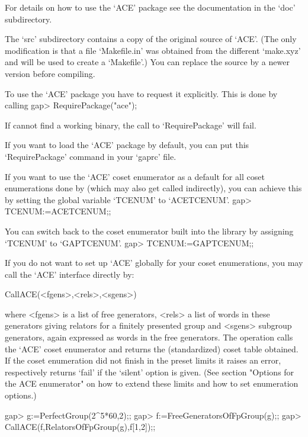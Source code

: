 For details on how to use the `ACE' package see the documentation in the
`doc' subdirectory.

The `src' subdirectory contains a copy of the original source of `ACE'. (The
only modification is that a file `Makefile.in' was obtained from the different
`make.xyz' and will be used to create a `Makefile'.)
You can replace the source by a newer version before compiling.


To use the `ACE' package you have to request it explicitly. This is done by
calling 
\begintt
gap> RequirePackage("ace");
\endtt

If {\GAP} cannot find a working binary, the call to `RequirePackage' will
fail.

If you want to load the `ACE' package by default, you can put this
`RequirePackage' command in your `gaprc' file.

If you want to use the `ACE' coset enumerator as a default for all coset
enumerations done by {\GAP} (which may also get called indirectly), you can 
achieve this by setting the global variable `TCENUM' to `ACETCENUM'.
\begintt
gap> TCENUM:=ACETCENUM;;
\endtt

You
can switch back to the coset enumerator built into the {\GAP} library by
assigning `TCENUM' to `GAPTCENUM'.
\begintt
gap> TCENUM:=GAPTCENUM;;
\endtt



If you do not want to set up `ACE' globally for your coset enumerations,
you may call the `ACE' interface directly by:

\>CallACE(<fgens>,<rels>,<sgens>)

where <fgens> is a list of free generators, <rels> a list of words in these
generators giving relators for a finitely presented group and <sgens>
subgroup generators, again expressed as words in the free generators. The
operation calls the `ACE' coset enumerator and returns the (standardized)
coset table obtained. If the coset enumeration did not finish in the preset
limits it raises an error, respectively returns `fail' if the `silent'
option is given.
(See section "Options for the ACE enumerator" on how to extend these
limits and how to set enumeration options.)

\begintt
gap> g:=PerfectGroup(2^5*60,2);;
gap> f:=FreeGeneratorsOfFpGroup(g);;
gap> CallACE(f,RelatorsOfFpGroup(g),f{[1,2]});;
\endtt

